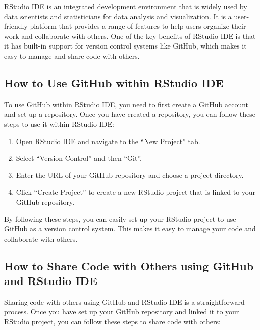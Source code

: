 \documentclass[
]{book}
\providecommand{\tightlist}{%
  \setlength{\itemsep}{0pt}\setlength{\parskip}{0pt}}
\begin{document}
RStudio IDE is an integrated development environment that is widely used by data scientists and statisticians for data analysis and visualization. It is a user-friendly platform that provides a range of features to help users organize their work and collaborate with others. One of the key benefits of RStudio IDE is that it has built-in support for version control systems like GitHub, which makes it easy to manage and share code with others.

\hypertarget{how-to-use-github-within-rstudio-ide}{%
\subsection{How to Use GitHub within RStudio IDE}\label{how-to-use-github-within-rstudio-ide}}

To use GitHub within RStudio IDE, you need to first create a GitHub account and set up a repository. Once you have created a repository, you can follow these steps to use it within RStudio IDE:

\begin{enumerate}
\def\labelenumi{\arabic{enumi}.}
\tightlist
\item
  Open RStudio IDE and navigate to the ``New Project'' tab.
\item
  Select ``Version Control'' and then ``Git''.
\item
  Enter the URL of your GitHub repository and choose a project directory.
\item
  Click ``Create Project'' to create a new RStudio project that is linked to your GitHub repository.
\end{enumerate}

By following these steps, you can easily set up your RStudio project to use GitHub as a version control system. This makes it easy to manage your code and collaborate with others.

\hypertarget{how-to-share-code-with-others-using-github-and-rstudio-ide}{%
\subsection{How to Share Code with Others using GitHub and RStudio IDE}\label{how-to-share-code-with-others-using-github-and-rstudio-ide}}

Sharing code with others using GitHub and RStudio IDE is a straightforward process. Once you have set up your GitHub repository and linked it to your RStudio project, you can follow these steps to share code with others:
\end{document}
